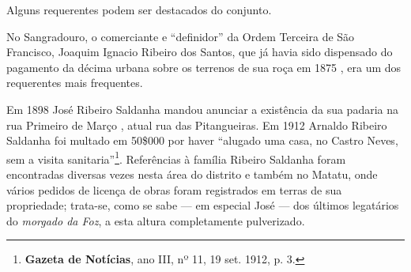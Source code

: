 Alguns requerentes podem ser destacados do conjunto.


No Sangradouro, o comerciante e ``definidor'' da Ordem Terceira de São Francisco, Joaquim Ignacio Ribeiro dos Santos, que já havia sido dispensado do pagamento da décima urbana sobre os terrenos de sua roça em 1875 \cite[p.~226]{bahia_assembleia_1875}, era um dos requerentes mais frequentes.

Em 1898 José Ribeiro Saldanha mandou anunciar a existência da sua padaria na rua Primeiro de Março \cite[p.~436]{reis_almanak_1898}, atual rua das Pitangueiras. Em 1912 Arnaldo Ribeiro Saldanha foi multado em 50\$000 por haver ``alugado uma casa, no Castro Neves, sem a visita sanitaria''\footnote{\textbf{Gazeta de Notícias}, ano III, nº 11, 19 set. 1912, p. 3.}. Referências à família Ribeiro Saldanha foram encontradas diversas vezes nesta área do distrito e também no Matatu, onde vários pedidos de licença de obras foram registrados em terras de sua propriedade; trata-se, como se sabe --- em especial José --- dos últimos legatários do \textit{morgado da Foz}, a esta altura completamente pulverizado.

